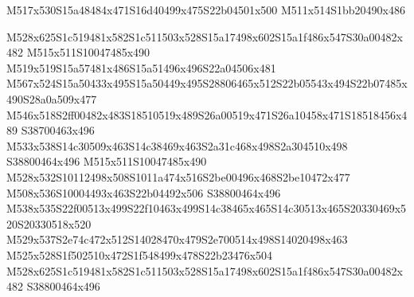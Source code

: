 \documentclass{article}
\begin{document}
\begin{multicols}{2}




\begin{center}
M517x530S15a48484x471S16d40499x475S22b04501x500 M511x514S1bb20490x486 
\end{center}


M528x625S1c519481x582S1c511503x528S15a17498x602S15a1f486x547S30a00482x482 M515x511S10047485x490 M519x519S15a57481x486S15a51496x496S22a04506x481 M567x524S15a50433x495S15a50449x495S28806465x512S22b05543x494S22b07485x490S28a0a509x477 M546x518S2ff00482x483S18510519x489S26a00519x471S26a10458x471S18518456x489 S38700463x496 M533x538S14c30509x463S14c38469x463S2a31c468x498S2a304510x498 S38800464x496 M515x511S10047485x490 M528x532S10112498x508S1011a474x516S2be00496x468S2be10472x477 M508x536S10004493x463S22b04492x506 S38800464x496 M538x535S22f00513x499S22f10463x499S14c38465x465S14c30513x465S20330469x520S20330518x520 M529x537S2e74c472x512S14028470x479S2e700514x498S14020498x463 M525x528S1f502510x472S1f548499x478S22b23476x504 M528x625S1c519481x582S1c511503x528S15a17498x602S15a1f486x547S30a00482x482 S38800464x496


\end{multicols}
\end{document}
